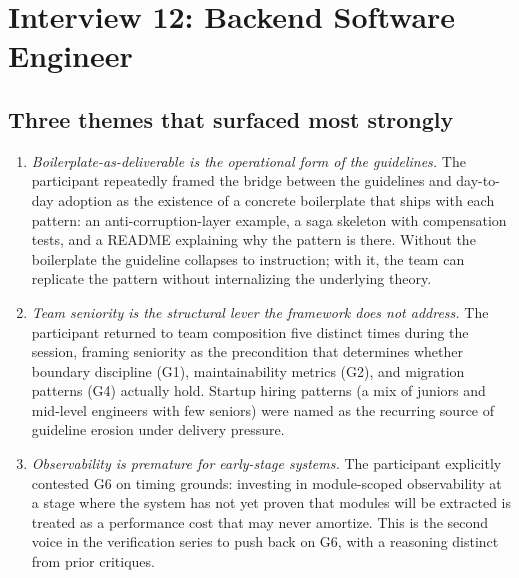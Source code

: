 
\section{Interview 12: Backend Software Engineer}
\label{sec:interview12}

\subsection*{Three themes that surfaced most strongly}

\begin{enumerate}[itemsep=8pt,topsep=2pt]
  \item \emph{Boilerplate-as-deliverable is the operational form of the guidelines.} The participant repeatedly framed the bridge between the guidelines and day-to-day adoption as the existence of a concrete boilerplate that ships with each pattern: an anti-corruption-layer example, a saga skeleton with compensation tests, and a README explaining why the pattern is there. Without the boilerplate the guideline collapses to instruction; with it, the team can replicate the pattern without internalizing the underlying theory.

  \item \emph{Team seniority is the structural lever the framework does not address.} The participant returned to team composition five distinct times during the session, framing seniority as the precondition that determines whether boundary discipline (G1), maintainability metrics (G2), and migration patterns (G4) actually hold. Startup hiring patterns (a mix of juniors and mid-level engineers with few seniors) were named as the recurring source of guideline erosion under delivery pressure.

  \item \emph{Observability is premature for early-stage systems.} The participant explicitly contested G6 on timing grounds: investing in module-scoped observability at a stage where the system has not yet proven that modules will be extracted is treated as a performance cost that may never amortize. This is the second voice in the verification series to push back on G6, with a reasoning distinct from prior critiques.
\end{enumerate}

